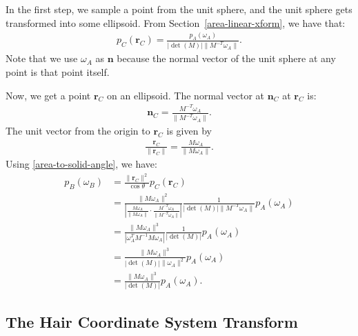 \documentclass[10pt]{article}
\newcommand{\ve}[1]{\mathbf{#1}}
\begin{document}
  In the first step, we sample a point from the unit sphere, and the unit sphere gets transformed into some ellipsoid.  From Section~\ref{area-linear-xform}, we have that:
  \begin{align*}
    p_C(\ve{r}_C) = \frac{p_A(\omega_A)}{|\det(M)| \| M^{-T} \omega_A \|}.
  \end{align*}
  Note that we use $\omega_A$ as $\ve{n}$ because the normal vector of the unit sphere at any point is that point itself.

  Now, we get a point $\ve{r}_C$ on an ellipsoid.  The normal vector at $\ve{n}_C$ at $\ve{r}_C$ is:
  \begin{align*}
    \ve{n}_C = \frac{M^{-T} \omega_A}{\| M^{-T} \omega_A \|}.
  \end{align*}
  The unit vector from the origin to $\ve{r}_C$ is given by
  \begin{align*}
    \frac{\ve{r}_C}{\| \ve{r}_C \| } = \frac{M\omega_A}{\| M\omega_A \|}.
  \end{align*}
  Using \ref{area-to-solid-angle}, we have:
  \begin{align*}
    p_B(\omega_B) 
    &= \frac{\| \ve{r}_C \|^2}{\cos\theta} p_C(\ve{r}_C) \\
    &= \frac{\| M \omega_A \|^2}{ | \frac{M \omega_A}{\|M\omega_A\|} \cdot \frac{M^{-T} \omega_A}{\| M^{-T} \omega_A \|} | } \frac{1}{ | \det(M) | \| M^{-T} \omega_A \| } p_A(\omega_A) \\
    &= \frac{\| M \omega_A \|^3}{ | \omega_A^T M^{-1} M \omega_A | } \frac{1}{ | \det(M) | } p_A(\omega_A)  \\
    &= \frac{\| M \omega_A \|^3 }{ | \det(M) | \| \omega_A \|^2} p_A(\omega_A) \\
    &= \frac{\| M \omega_A \|^3 }{ | \det(M) | } p_A(\omega_A).
  \end{align*}

  \subsection{The Hair Coordinate System Transform}
\end{document}
